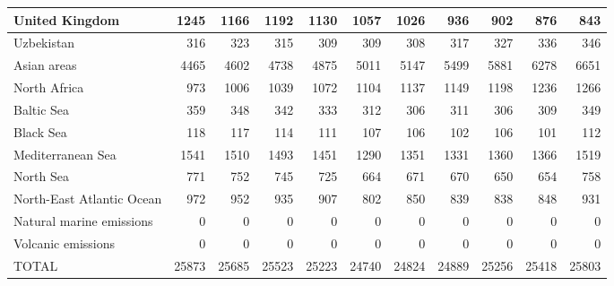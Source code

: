 \begin{table}
\begin{tabular}{|l|r|r|r|r|r|r|r|r|r|r|}
                United Kingdom&   1245&   1166&   1192&   1130&   1057&   1026&    936&    902&    876&    843\\\hline
                    Uzbekistan&    316&    323&    315&    309&    309&    308&    317&    327&    336&    346\\\hline
                   Asian areas&   4465&   4602&   4738&   4875&   5011&   5147&   5499&   5881&   6278&   6651\\\hline
                  North Africa&    973&   1006&   1039&   1072&   1104&   1137&   1149&   1198&   1236&   1266\\\hline
                    Baltic Sea&    359&    348&    342&    333&    312&    306&    311&    306&    309&    349\\\hline
                     Black Sea&    118&    117&    114&    111&    107&    106&    102&    106&    101&    112\\\hline
             Mediterranean Sea&   1541&   1510&   1493&   1451&   1290&   1351&   1331&   1360&   1366&   1519\\\hline
                     North Sea&    771&    752&    745&    725&    664&    671&    670&    650&    654&    758\\\hline
     North-East Atlantic Ocean&    972&    952&    935&    907&    802&    850&    839&    838&    848&    931\\\hline
      Natural marine emissions&      0&      0&      0&      0&      0&      0&      0&      0&      0&      0\\\hline
            Volcanic emissions&      0&      0&      0&      0&      0&      0&      0&      0&      0&      0\\\hline\hline
                         TOTAL&  25873&  25685&  25523&  25223&  24740&  24824&  24889&  25256&  25418&  25803\\\hline
 \end{tabular}
 \end{table}
 

